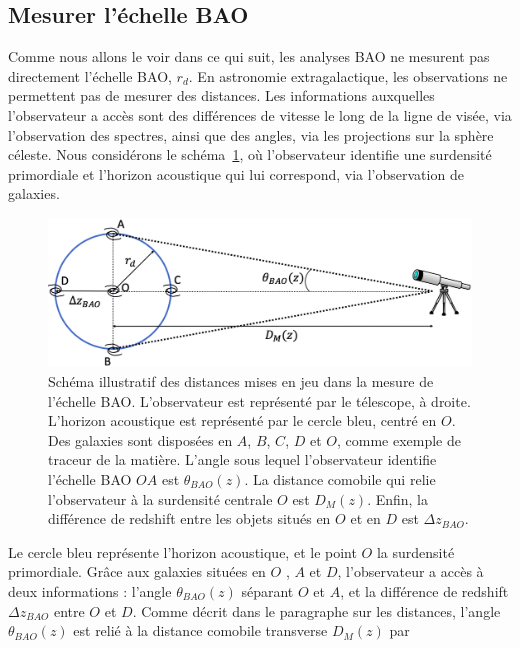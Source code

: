 \subsection{Mesurer l'échelle BAO}
\label{subsec:mesure_bao}
Comme nous allons le voir dans ce qui suit, les analyses BAO ne mesurent pas directement l'échelle BAO, $r_{d}$. En astronomie extragalactique, les observations  ne permettent pas de mesurer des distances. Les informations auxquelles l'observateur a accès sont des différences de vitesse le long de la ligne de visée, via l'observation des spectres, ainsi que des angles, via les projections sur la sphère céleste.
Nous considérons le schéma~\ref{fig:bao_dessin}, où l'observateur identifie une surdensité primordiale et l'horizon acoustique qui lui correspond, via l'observation de galaxies.
\begin{figure}
  \centering
  \includegraphics[scale=0.40]{bao_dessin}
  \caption{Schéma illustratif des distances mises en jeu dans la mesure de l'échelle BAO. L'observateur est représenté par le télescope, à droite. L'horizon acoustique est représenté par le cercle bleu, centré en $O$. Des galaxies sont disposées en $A$, $B$, $C$, $D$ et $O$, comme exemple de traceur de la matière. L'angle sous lequel l'observateur identifie l'échelle BAO $OA$ est $\theta_{BAO}(z)$. La distance comobile qui relie l'observateur à la surdensité centrale $O$ est $D_M(z)$. Enfin, la différence de redshift entre les objets situés en $O$ et en $D$ est $\Delta z_{BAO}$.}
  \label{fig:bao_dessin}
\end{figure}
Le cercle bleu représente l'horizon acoustique, et le point $O$ la surdensité primordiale. Grâce aux galaxies situées en $O$ , $A$  et $D$, l'observateur a accès à deux informations : l'angle $\theta_{BAO}(z)$ séparant $O$ et $A$, et la différence de redshift $\Delta z_{BAO}$ entre $O$ et $D$. Comme décrit dans le paragraphe sur les distances, l'angle $\theta_{BAO}(z)$ est relié à la distance comobile transverse $D_M(z)$ par
